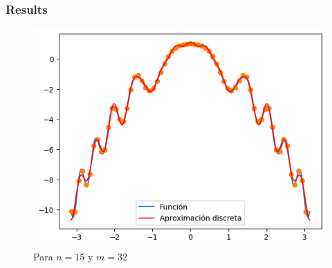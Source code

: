 \begin{frame}
    \frametitle{Results}

    \begin{figure}
        \centering
        \includegraphics[width=.75\paperwidth]{p7-A-discreta3.png}
        \caption{Para $n=15$ y $m=32$}
    \end{figure}
\end{frame}